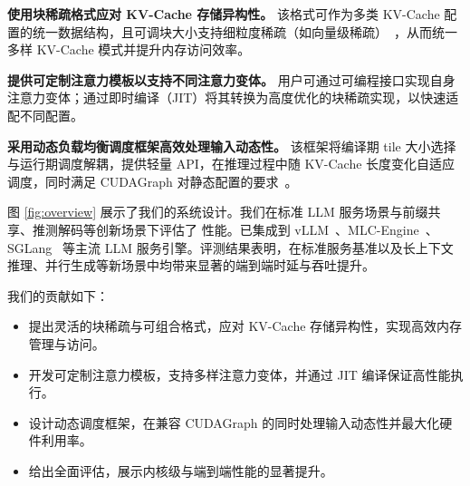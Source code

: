\textbf{\sys 使用块稀疏格式应对 KV-Cache 存储异构性。} 该格式可作为多类 KV-Cache 配置的统一数据结构，且可调块大小支持细粒度稀疏（如向量级稀疏）~\cite{chen2021tensorcoressparsity, li2022magicube}，从而统一多样 KV-Cache 模式并提升内存访问效率。

\textbf{\sys 提供可定制注意力模板以支持不同注意力变体。} 用户可通过可编程接口实现自身注意力变体；\sys 通过即时编译（JIT）将其转换为高度优化的块稀疏实现，以快速适配不同配置。

\textbf{\sys 采用动态负载均衡调度框架高效处理输入动态性。} 该框架将编译期 tile 大小选择与运行期调度解耦，提供轻量 API，在推理过程中随 KV-Cache 长度变化自适应调度，同时满足 CUDAGraph 对静态配置的要求~\cite{alan2019cudagraph, vinh2021pytorchcudagraph}。

图 \ref{fig:overview} 展示了我们的系统设计。我们在标准 LLM 服务场景与前缀共享、推测解码等创新场景下评估了 \sys 性能。\sys 已集成到 vLLM~\cite{kwon2023vllm}、MLC-Engine~\cite{mlcllm, lai2023relax}、SGLang~\cite{zheng2023sglang} 等主流 LLM 服务引擎。评测结果表明，\sys 在标准服务基准以及长上下文推理、并行生成等新场景中均带来显著的端到端时延与吞吐提升。

我们的贡献如下：
\begin{itemize}[itemsep=0pt,topsep=0pt,parsep=0pt]
    \item 提出灵活的块稀疏与可组合格式，应对 KV-Cache 存储异构性，实现高效内存管理与访问。
    \item 开发可定制注意力模板，支持多样注意力变体，并通过 JIT 编译保证高性能执行。
    \item 设计动态调度框架，在兼容 CUDAGraph 的同时处理输入动态性并最大化硬件利用率。
    \item 给出全面评估，展示内核级与端到端性能的显著提升。
\end{itemize}
\vspace{-1em}
